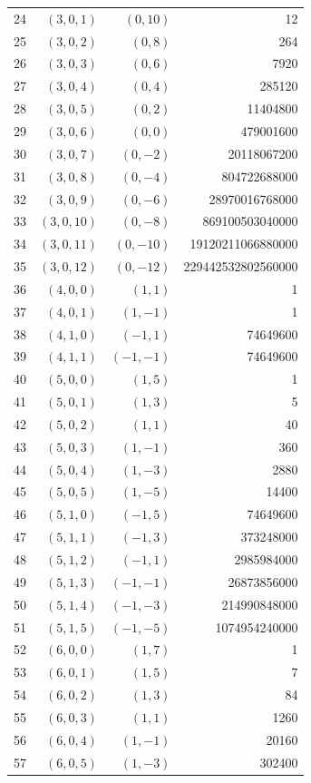 \begin{longtable}{rrrr}
24 & $(3,0,1)$ & $(0,10)$ & 12\\
25 & $(3,0,2)$ & $(0,8)$ & 264\\
26 & $(3,0,3)$ & $(0,6)$ & 7920\\
27 & $(3,0,4)$ & $(0,4)$ & 285120\\
28 & $(3,0,5)$ & $(0,2)$ & 11404800\\
29 & $(3,0,6)$ & $(0,0)$ & 479001600\\
30 & $(3,0,7)$ & $(0,-2)$ & 20118067200\\
31 & $(3,0,8)$ & $(0,-4)$ & 804722688000\\
32 & $(3,0,9)$ & $(0,-6)$ & 28970016768000\\
33 & $(3,0,10)$ & $(0,-8)$ & 869100503040000\\
34 & $(3,0,11)$ & $(0,-10)$ & 19120211066880000\\
35 & $(3,0,12)$ & $(0,-12)$ & 229442532802560000\\
36 & $(4,0,0)$ & $(1,1)$ & 1\\
37 & $(4,0,1)$ & $(1,-1)$ & 1\\
38 & $(4,1,0)$ & $(-1,1)$ & 74649600\\
39 & $(4,1,1)$ & $(-1,-1)$ & 74649600\\
40 & $(5,0,0)$ & $(1,5)$ & 1\\
41 & $(5,0,1)$ & $(1,3)$ & 5\\
42 & $(5,0,2)$ & $(1,1)$ & 40\\
43 & $(5,0,3)$ & $(1,-1)$ & 360\\
44 & $(5,0,4)$ & $(1,-3)$ & 2880\\
45 & $(5,0,5)$ & $(1,-5)$ & 14400\\
46 & $(5,1,0)$ & $(-1,5)$ & 74649600\\
47 & $(5,1,1)$ & $(-1,3)$ & 373248000\\
48 & $(5,1,2)$ & $(-1,1)$ & 2985984000\\
49 & $(5,1,3)$ & $(-1,-1)$ & 26873856000\\
50 & $(5,1,4)$ & $(-1,-3)$ & 214990848000\\
51 & $(5,1,5)$ & $(-1,-5)$ & 1074954240000\\
52 & $(6,0,0)$ & $(1,7)$ & 1\\
53 & $(6,0,1)$ & $(1,5)$ & 7\\
54 & $(6,0,2)$ & $(1,3)$ & 84\\
55 & $(6,0,3)$ & $(1,1)$ & 1260\\
56 & $(6,0,4)$ & $(1,-1)$ & 20160\\
57 & $(6,0,5)$ & $(1,-3)$ & 302400\\

\end{longtable}
